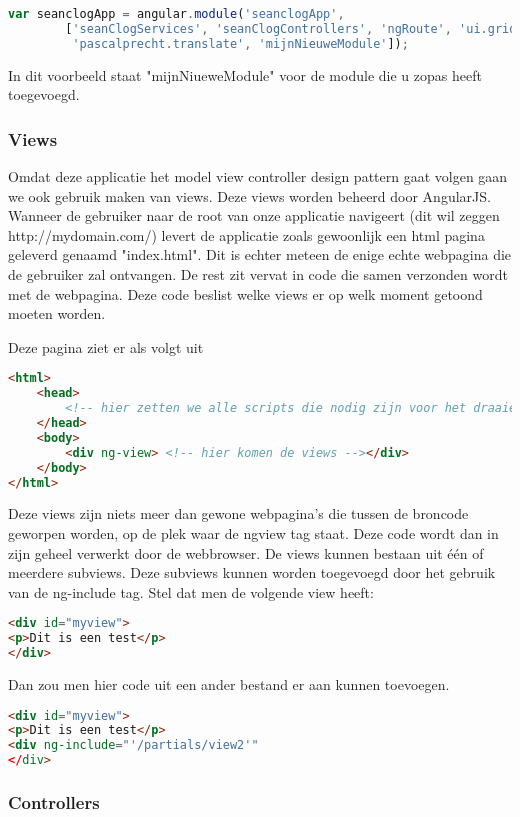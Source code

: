 \documentclass[a4paper,11pt]{article}
\begin{document}
\begin{lstlisting}[language=javascript]
var seanclogApp = angular.module('seanclogApp',
		['seanClogServices', 'seanClogControllers', 'ngRoute', 'ui.grid',
		 'pascalprecht.translate', 'mijnNieuweModule']);
\end{lstlisting}

In dit voorbeeld staat "mijnNiueweModule" voor de module die u zopas heeft toegevoegd.

\subsubsection{Views}
Omdat deze applicatie het model view controller design pattern gaat volgen gaan we ook gebruik maken van views. Deze views worden beheerd door AngularJS. Wanneer de gebruiker naar de root van onze applicatie navigeert (dit wil zeggen http://mydomain.com/) levert de applicatie zoals gewoonlijk een html pagina geleverd genaamd "index.html". Dit is echter meteen de enige echte webpagina die de gebruiker zal ontvangen. De rest zit vervat in code die samen verzonden wordt met de webpagina. Deze code beslist welke views er op welk moment getoond moeten worden.

Deze pagina ziet er als volgt uit
\begin{lstlisting}[language=html]
<html>
	<head>
		<!-- hier zetten we alle scripts die nodig zijn voor het draaien van de applicatie -->
	</head>
	<body>
		<div ng-view> <!-- hier komen de views --></div>
	</body>
</html>
\end{lstlisting}
Deze views zijn niets meer dan gewone webpagina's die tussen de broncode geworpen worden, op de plek waar de ngview tag staat. Deze code wordt dan in zijn geheel verwerkt door de webbrowser. De views kunnen bestaan uit één of meerdere subviews. Deze subviews kunnen worden toegevoegd door het gebruik van de ng-include tag. Stel dat men de volgende view heeft:
\begin{lstlisting}[language=html]
<div id="myview">
<p>Dit is een test</p>
</div>
\end{lstlisting}
Dan zou men hier code uit een ander bestand er aan kunnen toevoegen.
\begin{lstlisting}[language=html]
<div id="myview">
<p>Dit is een test</p>
<div ng-include="'/partials/view2'"
</div>
\end{lstlisting}

\subsubsection{Controllers}
\end{document}
